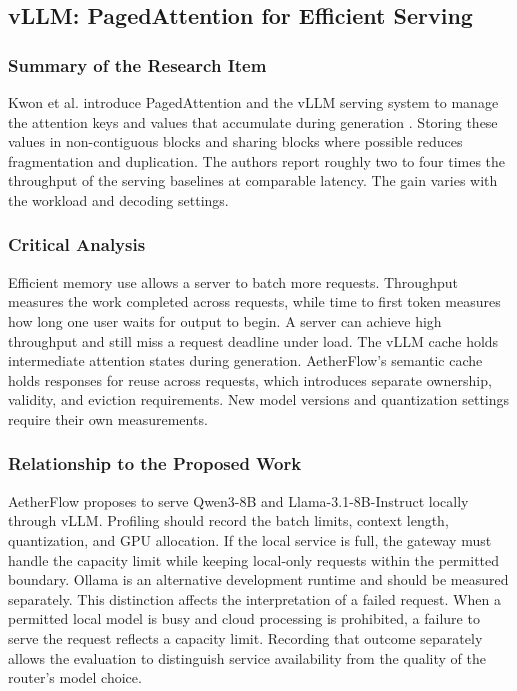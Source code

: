 \documentclass{FastFyp}
\begin{document}
\subsection{vLLM: PagedAttention for Efficient Serving}
\subsubsection{Summary of the Research Item}
Kwon et al. introduce PagedAttention and the vLLM serving system to manage the attention keys and values that accumulate during generation \cite{ref:vLLM}. Storing these values in non-contiguous blocks and sharing blocks where possible reduces fragmentation and duplication. The authors report roughly two to four times the throughput of the serving baselines at comparable latency. The gain varies with the workload and decoding settings.

\subsubsection{Critical Analysis}
Efficient memory use allows a server to batch more requests. Throughput measures the work completed across requests, while time to first token measures how long one user waits for output to begin. A server can achieve high throughput and still miss a request deadline under load. The vLLM cache holds intermediate attention states during generation. AetherFlow's semantic cache holds responses for reuse across requests, which introduces separate ownership, validity, and eviction requirements. New model versions and quantization settings require their own measurements.

\subsubsection{Relationship to the Proposed Work}
AetherFlow proposes to serve Qwen3-8B and Llama-3.1-8B-Instruct locally through vLLM. Profiling should record the batch limits, context length, quantization, and GPU allocation. If the local service is full, the gateway must handle the capacity limit while keeping local-only requests within the permitted boundary. Ollama is an alternative development runtime and should be measured separately. This distinction affects the interpretation of a failed request. When a permitted local model is busy and cloud processing is prohibited, a failure to serve the request reflects a capacity limit. Recording that outcome separately allows the evaluation to distinguish service availability from the quality of the router's model choice.
\end{document}
